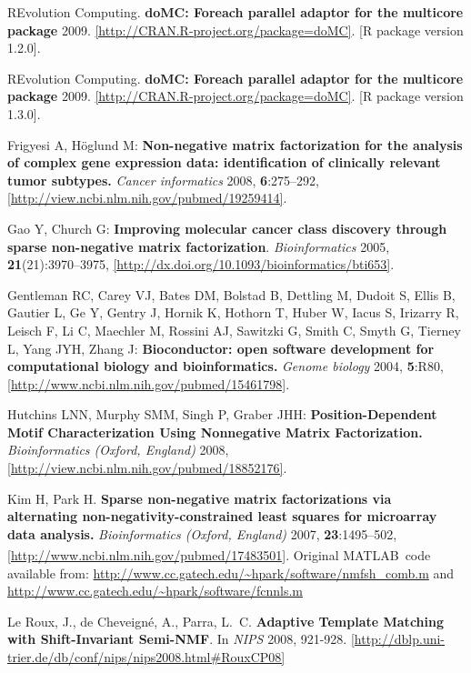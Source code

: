 \documentclass[a4paper]{article}
\newcommand{\MATLAB}{MATLAB\textsuperscript{\textregistered}\ }
\begin{document}
\begin{thebibliography}{}
{REvolution Computing}.
\textbf{doMC: Foreach parallel adaptor for the multicore package} 2009.
\url{[http://CRAN.R-project.org/package=doMC]}. [R package version 1.2.0].
  
{REvolution Computing}. 
\textbf{doMC: Foreach parallel adaptor for the multicore package} 2009.
\url{[http://CRAN.R-project.org/package=doMC]}. [R package version 1.3.0].

Frigyesi A, H\"{o}glund M: \textbf{Non-negative matrix factorization for the
  analysis of complex gene expression data: identification of clinically
  relevant tumor subtypes.} \emph{Cancer informatics} 2008,
  \textbf{6}:275--292,
  \url{[http://view.ncbi.nlm.nih.gov/pubmed/19259414]}.

Gao Y, Church G: \textbf{Improving molecular cancer class discovery through
  sparse non-negative matrix factorization}. \emph{Bioinformatics} 2005,
  \textbf{21}(21):3970--3975,
  \url{[http://dx.doi.org/10.1093/bioinformatics/bti653]}.

Gentleman RC, Carey VJ, Bates DM, Bolstad B, Dettling M, Dudoit S, Ellis B,
  Gautier L, Ge Y, Gentry J, Hornik K, Hothorn T, Huber W, Iacus S, Irizarry R,
  Leisch F, Li C, Maechler M, Rossini AJ, Sawitzki G, Smith C, Smyth G, Tierney
  L, Yang JYH, Zhang J: \textbf{{Bioconductor: open software development for
  computational biology and bioinformatics.}} \emph{Genome biology} 2004,
  \textbf{5}:R80,
  \url{[http://www.ncbi.nlm.nih.gov/pubmed/15461798]}.

Hutchins LNN, Murphy SMM, Singh P, Graber JHH:
\textbf{Position-Dependent Motif Characterization Using Nonnegative Matrix Factorization.}
  \emph{Bioinformatics (Oxford, England)} 2008,
  \url{[http://view.ncbi.nlm.nih.gov/pubmed/18852176]}.

Kim H, Park H.
\textbf{{Sparse non-negative matrix factorizations via alternating non-negativity-constrained least squares for microarray data analysis.}}
\emph{Bioinformatics (Oxford, England)} 2007,
\textbf{23}:1495--502,
\url{[http://www.ncbi.nlm.nih.gov/pubmed/17483501]}.
Original \MATLAB code available from: \url{http://www.cc.gatech.edu/~hpark/software/nmfsh_comb.m} 
and \url{http://www.cc.gatech.edu/~hpark/software/fcnnls.m}

 Le Roux, J., de Cheveigné, A., Parra, L.~C.
\textbf{Adaptive Template Matching with Shift-Invariant Semi-NMF}. 
In {\it NIPS} 2008, 921-928.
\url{[http://dblp.uni-trier.de/db/conf/nips/nips2008.html#RouxCP08]} 


\end{thebibliography}
\end{document}
